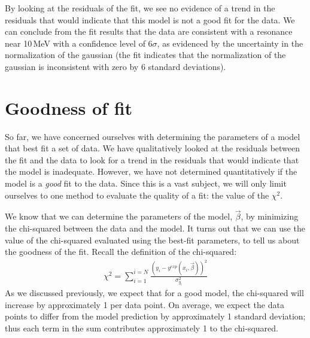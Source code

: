 
By looking at the residuals of the fit, we see no evidence of a trend in the residuals that would indicate that this model is not a good fit for the data. We can conclude from the fit results that the data are consistent with a resonance near 10\,MeV with a confidence level of 6$\sigma$, as evidenced by the uncertainty in the normalization of the gaussian (the fit indicates that the normalization of the gaussian is inconsistent with zero by 6 standard deviations).

\section{Goodness of fit}
So far, we have concerned ourselves with determining the parameters of a model that best fit a set of data.  We have qualitatively looked at the residuals between the fit and the data to look for a trend in the residuals that would indicate that the model is inadequate. However, we have not determined quantitatively if the model is a \textit{good} fit to the data. Since this is a vast subject, we will only limit ourselves to one method to evaluate the quality of a fit: the value of the $\chi^2$. 

We know that we can determine the parameters of the model, $\vec\beta$, by minimizing the chi-squared between the data and the model. It turns out that we can use the value of the chi-squared evaluated using the best-fit parameters, to tell us about the goodness of the fit. Recall the definition of the chi-squared:
\begin{align}
\chi^2=\sum_{i=1}^{i=N}\frac{(y_i-y^{exp}(x_i,\vec\beta))^2}{\sigma_{y_i}^2}
\end{align}
As we discussed previously, we expect that for a good model, the chi-squared will increase by approximately 1 per data point. On average, we expect the data points to differ from the model prediction by approximately 1 standard deviation; thus each term in the sum contributes approximately 1 to the chi-squared.

